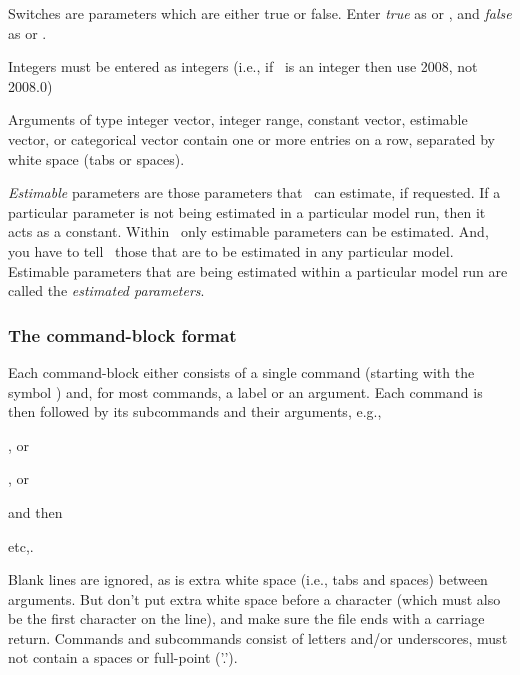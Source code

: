 Switches are parameters which are either true or false. Enter \emph{true} as  or , and \emph{false} as  or . 

Integers must be entered as integers (i.e., if \ is an integer then use 2008, not 2008.0)

Arguments of type integer vector, integer range, constant vector, estimable vector, or categorical vector contain one or more entries on a row, separated by white space (tabs or spaces). 

\emph{Estimable} parameters are those parameters that \SPM\ can estimate, if requested. If a particular parameter is not being estimated in a particular model run, then it acts as a constant.  Within \SPM\, only estimable parameters can be estimated. And, you have to tell \SPM\ those that are to be estimated in any particular model. Estimable parameters that are being estimated within a particular model run are called the \emph{estimated parameters}.

\subsubsection{The command-block format}

Each command-block either consists of a single command (starting with the symbol \@) and, for most commands, a label or an argument. Each command is then followed by its subcommands and their arguments, e.g., 

\begin{description}
\item {}, or 
\item {} , or
\item {} 
\end{description}

and then
\begin{description}
\item {} 
\item {} 
\item etc,.
\end{description}

Blank lines are ignored, as is extra white space (i.e., tabs and spaces) between arguments. But don't put extra white space before a \command{} character (which must also be the first character on the line), and make sure the file ends with a carriage return. Commands and subcommands consist of letters and/or underscores, must not contain a spaces or full-point ('.').

